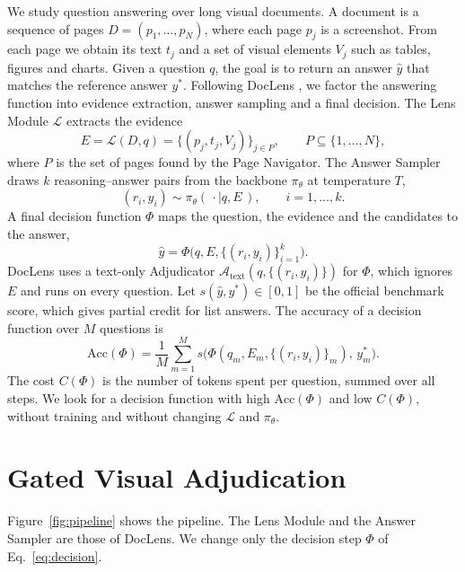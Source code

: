 \documentclass[conference]{IEEEtran}
\begin{document}
We study question answering over long visual documents. A document is a sequence of pages $D=(p_1,\dots,p_N)$, where each page $p_j$ is a screenshot. From each page we obtain its text $t_j$ and a set of visual elements $V_j$ such as tables, figures and charts. Given a question $q$, the goal is to return an answer $\hat y$ that matches the reference answer $y^\ast$. Following DocLens \cite{zhu2025doclens}, we factor the answering function into evidence extraction, answer sampling and a final decision. The Lens Module $\mathcal{L}$ extracts the evidence
\begin{equation}
E=\mathcal{L}(D,q)=\{(p_j,t_j,V_j)\}_{j\in P},\qquad P\subseteq\{1,\dots,N\},
\label{eq:lens}
\end{equation}
where $P$ is the set of pages found by the Page Navigator. The Answer Sampler draws $k$ reasoning--answer pairs from the backbone $\pi_\theta$ at temperature $T$,
\begin{equation}
(r_i,y_i)\sim\pi_\theta(\,\cdot\mid q,E\,),\qquad i=1,\dots,k.
\label{eq:sampler}
\end{equation}
A final decision function $\Phi$ maps the question, the evidence and the candidates to the answer,
\begin{equation}
\hat y=\Phi\bigl(q,E,\{(r_i,y_i)\}_{i=1}^{k}\bigr).
\label{eq:decision}
\end{equation}
DocLens uses a text-only Adjudicator $\mathcal{A}_{\mathrm{text}}(q,\{(r_i,y_i)\})$ for $\Phi$, which ignores $E$ and runs on every question. Let $s(\hat y,y^\ast)\in[0,1]$ be the official benchmark score, which gives partial credit for list answers. The accuracy of a decision function over $M$ questions is
\begin{equation}
\mathrm{Acc}(\Phi)=\frac{1}{M}\sum_{m=1}^{M}s\bigl(\Phi(q_m,E_m,\{(r_i,y_i)\}_m),\,y^\ast_m\bigr).
\label{eq:acc}
\end{equation}
The cost $C(\Phi)$ is the number of tokens spent per question, summed over all steps. We look for a decision function with high $\mathrm{Acc}(\Phi)$ and low $C(\Phi)$, without training and without changing $\mathcal{L}$ and $\pi_\theta$.

\section{Gated Visual Adjudication}
\label{sec:method}

Figure~\ref{fig:pipeline} shows the pipeline. The Lens Module and the Answer Sampler are those of DocLens. We change only the decision step $\Phi$ of Eq.~\eqref{eq:decision}.
\end{document}

